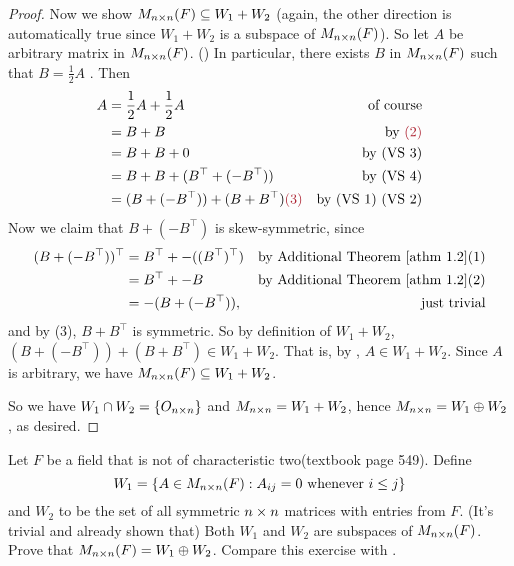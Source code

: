 \begin{proof}
Now we show \(M_{n \times n}(F) \subseteq W_1 + W_2\) (again, the other direction is automatically true since \(W_1 + W_2\) is a subspace of \(M_{n \times n}(F)\)).
So let \(A\) be arbitrary matrix in \(M_{n \times n}(F)\).
()
In particular, there exists \(B\) in \(M_{n \times n}(F)\) such that \(B = \frac1{2} A\) .
Then
\begin{align*}
    A & = \frac1{2} A + \frac1{2} A & \text{of course} \\
      & = B + B & \text{by \MAROON{(2)}} \\
      & = B + B + 0 & \text{by (VS 3)} \\
      & = B + B + (B^\top + (-B^\top)) & \text{by (VS 4)} \\
      & = (B + (-B^\top)) + (B + B^\top) \MAROON{(3)}  & \text{by (VS 1) (VS 2)}
\end{align*}
Now we claim that \(B + (-B^\top)\) is skew-symmetric, since
\begin{align*}
    (B + (-B^\top))^\top & = B^\top + -((B^\top)^\top) & \text{by \ATHM{1.2}(1)} \\
                   & = B^\top + -B & \text{by \ATHM{1.2}(2)} \\
                   & = -(B + (-B^\top)), & \text{just trivial}
\end{align*}
and by (3), \(B + B^\top\) is symmetric.
So by definition of \(W_1 + W_2\), \((B + (-B^\top)) + (B + B^\top) \in W_1 + W_2\).
That is, by , \(A \in W_1 + W_2\).
Since \(A\) is arbitrary, we have \(M_{n \times n}(F) \subseteq W_1 + W_2\).

So we have \(W_1 \cap W_2 = \{ O_{n \times n} \}\) and \(M_{n \times n} = W_1 + W_2\), hence \(M_{n \times n} = W_1 \oplus W_2\), as desired.
\end{proof}

\begin{exercise} \label{exercise 1.3.29}
Let \(F\) be a field that is not of characteristic two(textbook page 549).
Define
\[
    W_1 = \{ A \in M_{n \times n}(F) : A_{ij} = 0 \text{ whenever } i \le j \}
\]
and \(W_2\) to be the set of all symmetric \(n \times n\) matrices with entries from \(F\).
(It's trivial and already shown that) Both \(W_1\) and \(W_2\) are subspaces of \(M_{n \times n}(F)\).
Prove that \(M_{n \times n}(F) = W_1 \oplus W_2\).
Compare this exercise with .
\end{exercise}

